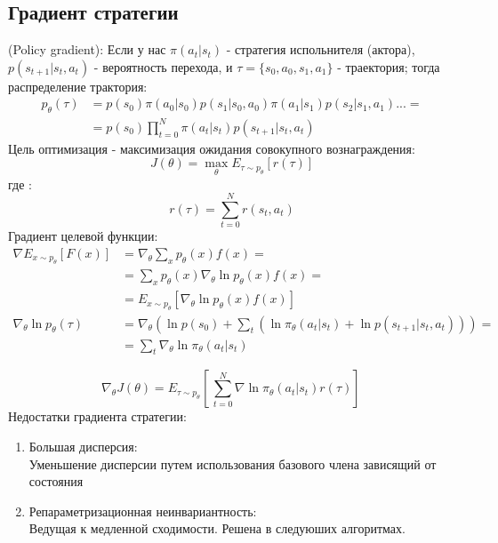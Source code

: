\documentclass[a4paper,12pt]{article}
\begin{document}
\subsection{Градиент стратегии}
(Policy gradient):
Если у нас $\pi(a_t|s_t)$ - стратегия испольнителя (актора), $p(s_{t+1}|s_t,a_t)$ - вероятность перехода, и $\tau=\{s_0,a_0,s_1,a_1\}$ - траектория; тогда распределение трактория:
\begin{align*}
    p_\theta(\tau)&=p(s_0)\pi(a_0|s_0)p(s_1|s_0,a_0)\pi(a_1|s_1)p(s_2|s_1,a_1)...=\\
    &= p(s_0)\prod_{t=0}^{N}\pi(a_t|s_t)p(s_{t+1}|s_t,a_t)
\end{align*}
Цель оптимизация - максимизация ожидания совокупного вознаграждения:
$$J(\theta)=\max_{\theta} E_{\tau\sim p_\theta}[r(\tau)]$$
где : $$r(\tau)=\sum_{t=0}^{N}r(s_t,a_t)$$
Градиент целевой функции:
\begin{align*}
    \nabla E_{x\sim p_\theta} [F(x)]&=\nabla_\theta \sum_{x} p_\theta (x) f(x)=\\
    &=\sum_x p_\theta(x)\nabla_\theta \ln{p_\theta(x)f(x)}=\\
    &=E_{x\sim p_\theta}[\nabla_\theta \ln{p_\theta (x) f(x)}]\\
    \nabla_\theta \ln{p_\theta(\tau)}&=\nabla_\theta (\ln{p(s_0)+\sum_t (\ln{\pi_\theta (a_t|s_t)}+\ln{p(s_{t+1}|s_t,a_t)})})=\\
    &=\sum_t \nabla_\theta \ln{\pi_\theta (a_t|s_t)}
\end{align*}

$$\nabla_\theta J(\theta)=E_{\tau \sim p_\theta}[\,\sum_{t=0}^{N}\nabla \ln{\pi_\theta(a_t|s_t)r(\tau)}]\,$$
Недостатки градиента стратегии:
\begin{enumerate}
    \item Большая дисперсия:\\
    Уменьшение дисперсии путем использования базового члена зависящий от состояния  
    \item Репараметризационная неинвариантность:\\
    Ведущая к медленной сходимости. Решена в следуюших алгоритмах.
\end{enumerate}
\end{document}
